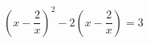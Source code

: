 \begin{ex}[type=equation]
	\begin{condition}
		$\left(x - \dfrac{2}{x}\right)^2 -2\left(x -  \dfrac{2}{x}\right) = 3$
	\end{condition}
\end{ex}